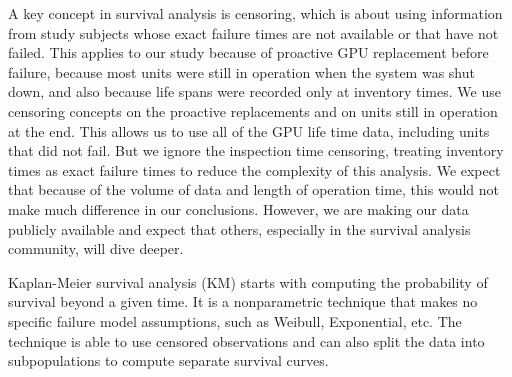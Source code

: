 A key concept in survival analysis is censoring, which is about using
information from study subjects whose exact failure times are not
available or that have not failed. This applies to our study because
of proactive GPU replacement before failure, because most units were
still in operation when the system was shut down, and also because
life spans were recorded only at inventory times. We use censoring
concepts on the proactive replacements and on units still in operation at
the end. This allows us to use all of the GPU life time data,
including units that did not fail. But we ignore the inspection time
censoring, treating inventory times as exact failure times to reduce
the complexity of this analysis. We expect that because of the volume
of data and length of operation time, this would not make much
difference in our conclusions. However, we are making our data
publicly available and expect that others, especially in the survival
analysis community, will dive deeper.

Kaplan-Meier survival analysis (KM)
\cite{kaplan-meier1958,survival-book} starts with computing the
probability of survival beyond a given time. It is a nonparametric
technique that makes no specific failure model assumptions, such as
Weibull, Exponential, etc. The technique is able to use censored
observations and can also split the data into subpopulations to
compute separate survival curves.


